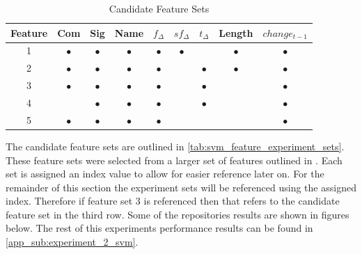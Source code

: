 \begin{table}[ht]
\begin{center}

    \begin{tabular}{|c|c|c|c|c|c|c|c|c|}
        \hline
        Feature & Com & Sig & Name & $f_{\Delta}$ & $sf_{\Delta}$ & $t_\Delta$ & Length & $change_{t-1}$ \\
         \hline
        1 & $\bullet$ & $\bullet$ & $\bullet$ & $\bullet$ & $\bullet$ & & $\bullet$ & $\bullet$ \\
        2 & $\bullet$ & $\bullet$ & $\bullet$ & $\bullet$ & & $\bullet$ & $\bullet$ & $\bullet$ \\
        3 & $\bullet$ & $\bullet$ & $\bullet$ & $\bullet$ & & $\bullet$ & & $\bullet$ \\
        4 & & $\bullet$ & $\bullet$ & $\bullet$ & & $\bullet$ & & $\bullet$ \\
        5 & $\bullet$ & $\bullet$ & $\bullet$ & $\bullet$ & & & & $\bullet$ \\ \hline
    \end{tabular}
    \caption{Candidate Feature Sets}
    \label{tab:svm_feature_experiment_sets}
\end{center}
\end{table}

The candidate feature sets are outlined in \autoref{tab:svm_feature_experiment_sets}. These feature sets were selected from a larger set of features outlined in . Each set is assigned an index value to allow for easier reference later on. For the remainder of this section the experiment sets will be referenced using the assigned index. Therefore if feature set 3 is referenced then that refers to the candidate feature set in the third row. Some of the repositories results are shown in figures below. The rest of this experiments performance results can be found in \autoref{app_sub:experiment_2_svm}.


